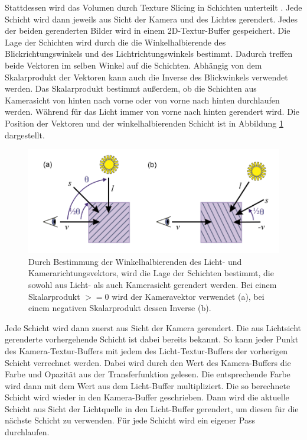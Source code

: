 Stattdessen wird das Volumen durch Texture Slicing in Schichten unterteilt \cite{Hadwiger06}. Jede Schicht wird dann jeweils aus Sicht der Kamera und des Lichtes gerendert. Jedes der beiden gerenderten Bilder wird in einem 2D-Textur-Buffer gespeichert. 
Die Lage der Schichten wird durch die die Winkelhalbierende des Blickrichtungswinkels und des Lichtrichtungswinkels bestimmt. Dadurch treffen beide Vektoren im selben Winkel auf die Schichten. Abhängig von dem Skalarprodukt der Vektoren kann auch die Inverse des Blickwinkels verwendet werden. Das Skalarprodukt bestimmt außerdem, ob die Schichten aus Kamerasicht von hinten nach vorne oder von vorne nach hinten durchlaufen werden. Während für das Licht immer von vorne nach hinten gerendert wird.
Die Position der Vektoren und der winkelhalbierenden Schicht ist in Abbildung \ref{img:halfAngleSlice} dargestellt.

\begin{figure}[!htb]
	\centering
	\includegraphics[width=0.7\linewidth]{images/halfAngleSlice.png}
	\caption{Durch Bestimmung der Winkelhalbierenden des Licht- und Kamerarichtungsvektors, wird die Lage der Schichten bestimmt, die sowohl aus Licht- als auch Kamerasicht gerendert werden. Bei einem Skalarprodukt $>=0$ wird der Kameravektor verwendet (a), bei einem negativen Skalarprodukt dessen Inverse (b).}
	\label{img:halfAngleSlice}
\end{figure}
\FloatBarrier

Jede Schicht wird dann zuerst aus Sicht der Kamera gerendert. Die aus Lichtsicht gerenderte vorhergehende Schicht ist dabei bereits bekannt. So kann jeder Punkt des Kamera-Textur-Buffers mit jedem des Licht-Textur-Buffers der vorherigen Schicht verrechnet werden. Dabei wird durch den Wert des Kamera-Buffers die Farbe und Opazität aus der Transferfunktion gelesen. Die entsprechende Farbe wird dann mit dem Wert aus dem Licht-Buffer multipliziert. Die so berechnete Schicht wird wieder in den Kamera-Buffer geschrieben. Dann wird die aktuelle Schicht aus Sicht der Lichtquelle in den Licht-Buffer gerendert, um diesen für die nächste Schicht zu verwenden.
Für jede Schicht wird ein eigener Pass durchlaufen.

